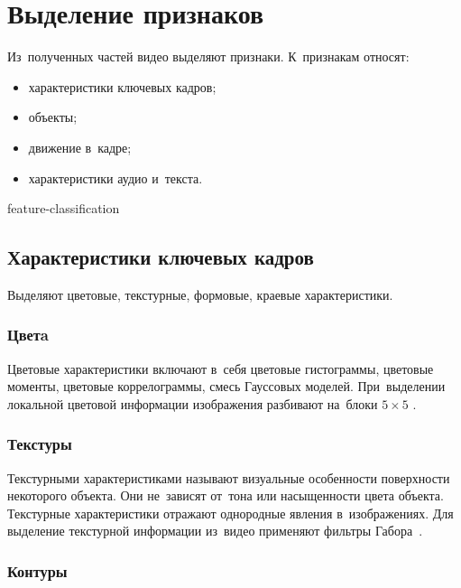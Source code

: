\section{Выделение признаков}

Из~полученных частей видео выделяют признаки.
К~признакам относят:
\begin{itemize}
    \item характеристики ключевых кадров;
    \item объекты;
    \item движение в~кадре;
    \item характеристики аудио и~текста.
\end{itemize}


\begin{figuredt}
    {feature-classification}
\end{figuredt}


\subsection{Характеристики ключевых кадров}

Выделяют цветовые, текстурные, формовые, краевые характеристики.

\subsubsection{Цветa}

Цветовые характеристики включают в~себя цветовые гистограммы,
цветовые моменты,
цветовые коррелограммы,
смесь Гауссовых моделей.
При~выделении локальной цветовой информации изображения разбивают
на~блоки $5 \times 5$ \cite{Yan:2007}.


\subsubsection{Текстуры}

Текстурными характеристиками называют визуальные особенности поверхности
некоторого объекта. Они не~зависят от~тона или насыщенности цвета объекта.
Текстурные характеристики отражают однородные явления в~изображениях.
Для выделение текстурной информации
из~видео применяют фильтры Габора\ \cite{Adcock:2004}.

\subsubsection{Контуры}

